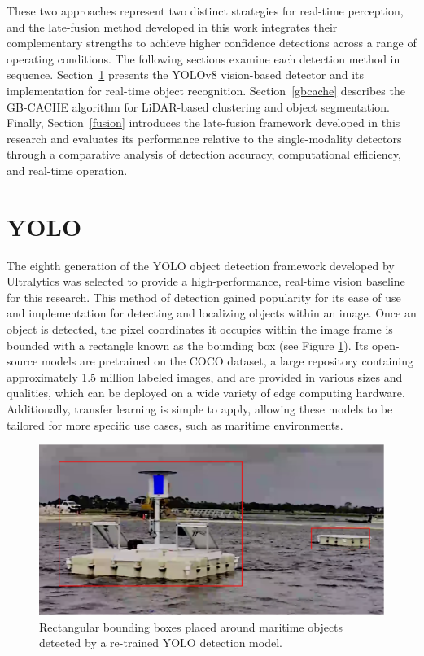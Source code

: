 \documentclass{erauthesis}
\begin{document}
These two approaches represent two distinct strategies for real-time perception, and the late-fusion method developed in this work integrates their complementary strengths to achieve higher confidence detections across a range of operating conditions.
The following sections examine each detection method in sequence.
Section~\ref{yolo} presents the YOLOv8 vision-based detector and its implementation for real-time object recognition.
Section~\ref{gbcache} describes the GB-CACHE algorithm for LiDAR-based clustering and object segmentation.
Finally, Section~\ref{fusion} introduces the late-fusion framework developed in this research and evaluates its performance relative to the single-modality detectors through a comparative analysis of detection accuracy, computational efficiency, and real-time operation.

\section{YOLO} \label{yolo}

The eighth generation of the \ac{YOLO} object detection framework developed by Ultralytics was selected to provide a high-performance, real-time vision baseline for this research. 
This method of detection gained popularity for its ease of use and implementation for detecting and localizing objects within an image.
Once an object is detected, the pixel coordinates it occupies within the image frame is bounded with a rectangle known as the bounding box (see Figure \ref{fig:YOLO_tower}).
Its open-source models are pretrained on the COCO dataset, a large repository containing approximately 1.5 million labeled images, and are provided in various sizes and qualities, which can be deployed on a wide variety of edge computing hardware.
Additionally, transfer learning is simple to apply, allowing these models to be tailored for more specific use cases, such as maritime environments.

\begin{figure}
    \centering
    \includegraphics[width=0.75\linewidth]{Images/YOLO_ex1.png}
    \caption{Rectangular bounding boxes placed around maritime objects detected by a re-trained YOLO detection model.}
    \label{fig:YOLO_tower}
\end{figure}
\end{document}
